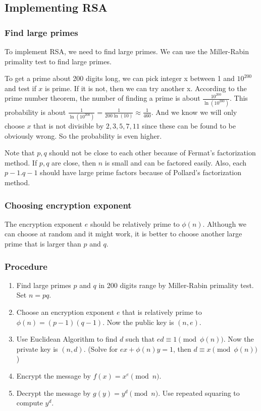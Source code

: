 \documentclass[letterpaper,12pt,oneside]{article}
\begin{document}
\subsection{Implementing RSA}
\subsubsection{Find large primes}
To implement RSA, we need to find large primes. We can use the Miller-Rabin primality test to find large primes.

To get a prime about 200 digits long, we can pick integer x between 1 and $10^{200}$ and test if $x$ is prime. If it is not, then we can try another x. According to the prime number theorem, the number of finding a prime is about $\frac{10^{200}}{\ln (10^{200})}$. This probability is about $\frac{1}{\ln(10^{200})}=\frac{1}{200\ln(10)}\approx \frac{1}{460}$. And we know we will only choose $x$ that is not divisible by $2,3,5,7,11$ since these can be found to be obviously wrong. So the probability is even higher.

Note that $p,q$ should not be close to each other because of Fermat's factorization method. If $p,q$ are close, then $n$ is small and can be factored easily. Also, each $p-1. q-1$ should have large prime factors because of Pollard's factorization method.
\subsubsection{Choosing encryption exponent}
The encryption exponent $e$ should be relatively prime to $\phi(n)$. Although we can choose at random and it might work, it is better to choose another large prime that is larger than $p$ and $q$.
\subsubsection{Procedure}
\begin{enumerate}
    \item Find large primes $p$ and $q$ in 200 digits range by Miller-Rabin primality test. Set $n=pq$.
    \item Choose an encryption exponent $e$ that is relatively prime to $\phi(n) = (p-1)(q-1)$. Now the public key is $(n,e)$.
    \item Use Euclidean Algorithm to find $d$ such that $ed\equiv 1 \pmod {\phi(n)}$. Now the private key is $(n,d)$. (Solve for $ex+\phi(n)y=1$, then $d\equiv x \pmod {\phi(n)}$)
    \item Encrypt the message by $f(x)=x^e \pmod n$.
    \item Decrypt the message by $g(y)=y^d \pmod n$. Use repeated squaring to compute $y^d$.
\end{enumerate}
\end{document}
